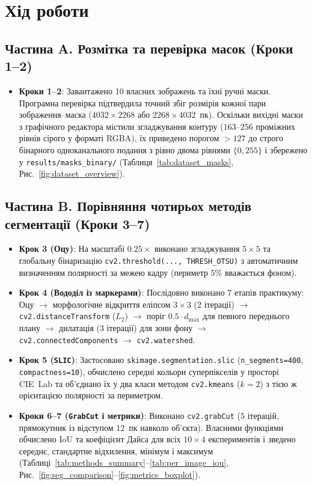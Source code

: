 \documentclass[14pt, a4paper]{extarticle}
\begin{document}
\section{Хід роботи}

\subsection{Частина A. Розмітка та перевірка масок (Кроки 1--2)}
\begin{itemize}
    \item \textbf{Кроки 1--2}: Завантажено 10 власних зображень та їхні ручні маски. Програмна перевірка підтвердила точний збіг розмірів кожної пари зображення--маска ($4032 \times 2268$ або $2268 \times 4032$~пк). Оскільки вихідні маски з графічного редактора містили згладжування контуру ($163$--$256$ проміжних рівнів сірого у форматі RGBA), їх приведено порогом $> 127$ до строго бінарного одноканального подання з рівно двома рівнями $\{0, 255\}$ і збережено у \texttt{results/masks\_binary/} (Таблиця~\ref{tab:dataset_masks}, Рис.~\ref{fig:dataset_overview}).
\end{itemize}

\subsection{Частина B. Порівняння чотирьох методів сегментації (Кроки 3--7)}
\begin{itemize}
    \item \textbf{Крок 3 (Оцу)}: На масштабі $0.25\times$ виконано згладжування $5 \times 5$ та глобальну бінаризацію \texttt{cv2.threshold(..., THRESH\_OTSU)} з автоматичним визначенням полярності за межею кадру (периметр $5\%$ вважається фоном).
    \item \textbf{Крок 4 (Вододіл із маркерами)}: Послідовно виконано 7 етапів практикуму: Оцу $\to$ морфологічне відкриття еліпсом $3 \times 3$ (2 ітерації) $\to$ \texttt{cv2.distanceTransform} ($L_2$) $\to$ поріг $0.5 \cdot d_{\max}$ для певного переднього плану $\to$ дилатація (3 ітерації) для зони фону $\to$ \texttt{cv2.connectedComponents} $\to$ \texttt{cv2.watershed}.
    \item \textbf{Крок 5 (\texttt{SLIC})}: Застосовано \texttt{skimage.segmentation.slic} (\texttt{n\_segments=400}, \texttt{compactness=10}), обчислено середні кольори суперпікселів у просторі CIE~Lab та об'єднано їх у два класи методом \texttt{cv2.kmeans} ($k = 2$) з тією ж орієнтацією полярності за периметром.
    \item \textbf{Кроки 6--7 (\texttt{GrabCut} і метрики)}: Виконано \texttt{cv2.grabCut} ($5$ ітерацій, прямокутник із відступом $12$~пк навколо об'єкта). Власними функціями обчислено $\text{IoU}$ та коефіцієнт Дайса для всіх $10 \times 4$ експериментів і зведено середнє, стандартне відхилення, мінімум і максимум (Таблиці~\ref{tab:methods_summary}--\ref{tab:per_image_iou}, Рис.~\ref{fig:seg_comparison}--\ref{fig:metrics_boxplot}).
\end{itemize}
\end{document}
